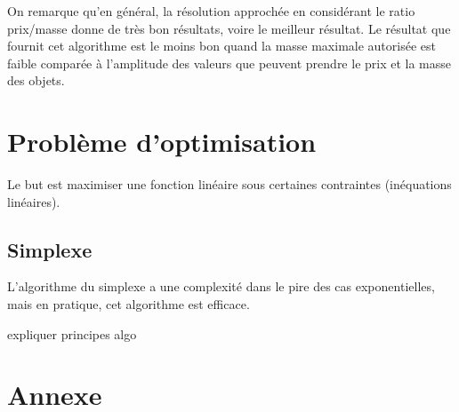 \documentclass{scrartcl}
\begin{document}
    On remarque qu'en général, la résolution approchée en considérant le ratio
    \nobreak prix/masse donne de très bon résultats, voire le meilleur
    résultat. Le résultat que fournit cet algorithme est le moins bon quand la
    masse maximale autorisée est faible comparée à l'amplitude des valeurs que
    peuvent prendre le prix et la masse des objets.

\section{Problème d'optimisation} %
  Le but est maximiser une fonction linéaire sous certaines contraintes
  (inéquations linéaires).

  \subsection{Simplexe}
    L'algorithme du simplexe a une complexité dans le pire des cas
    exponentielles, mais en pratique, cet algorithme est efficace.

    expliquer principes algo


\section{Annexe}
  \lstlistoflistings
  
  
\end{document}
